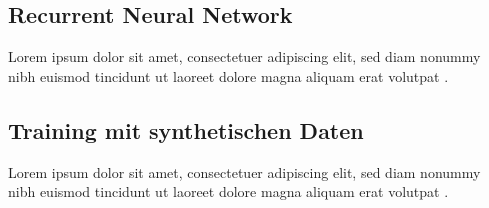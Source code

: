 \subsection{Recurrent Neural Network}
\label{grundlagen_nn_rnn}

Lorem ipsum dolor sit amet, consectetuer adipiscing elit, sed diam nonummy nibh euismod tincidunt ut laoreet dolore magna aliquam erat volutpat \cite{latexcompanion}. 


\subsection{Training mit synthetischen Daten}
\label{grundlagen_nn_synthetisch}

Lorem ipsum dolor sit amet, consectetuer adipiscing elit, sed diam nonummy nibh euismod tincidunt ut laoreet dolore magna aliquam erat volutpat \cite{latexcompanion}. 


